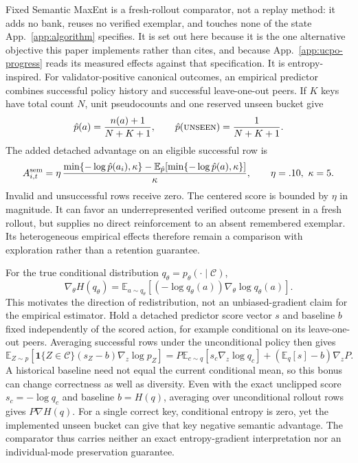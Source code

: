 \documentclass{article}
\newcommand{\1}{\mathbf 1}
\newcommand{\E}{\mathbb E}
\theoremstyle{remark}
\theoremstyle{definition}
\theoremstyle{plain}
\begin{document}
Fixed Semantic MaxEnt is a fresh-rollout comparator, not a replay method: it
adds no bank, reuses no verified exemplar, and touches none of the state
App.~\ref{app:algorithm} specifies. It is set out here because it is the one
alternative objective this paper implements rather than cites, and because
App.~\ref{app:ucpo-progress} reads its measured effects against that
specification. It is entropy-inspired.
For validator-positive canonical outcomes, an empirical predictor combines
successful policy history and successful leave-one-out peers. If $K$ keys
have total count $N$, unit pseudocounts and one reserved unseen bucket give
\begin{equation}
  \hat p(a)=\frac{n(a)+1}{N+K+1},\qquad
  \hat p(\textsc{unseen})=\frac{1}{N+K+1}.
  \label{eq:open-set-predictor}
\end{equation}
The added detached advantage on an eligible successful row is
\begin{equation}
  A^{\rm sem}_{i,t}=\eta\,
  \frac{\min\{-\log\hat p(a_i),\kappa\}
    -\E_{\hat p}[\min\{-\log\hat p(a),\kappa\}]}{\kappa},
  \qquad \eta=.10,\ \kappa=5.
  \label{eq:legacy-semantic-advantage}
\end{equation}
Invalid and unsuccessful rows receive zero. The centered score is bounded
by $\eta$ in magnitude. It can favor an underrepresented verified outcome
present in a fresh rollout, but supplies no direct reinforcement to an
absent remembered exemplar. Its heterogeneous empirical effects therefore
remain a comparison with exploration rather than a retention guarantee.

For the true conditional distribution $q_\theta=p_\theta(\cdot\mid\mathcal C)$,
\begin{equation}
 \nabla_\theta H(q_\theta)
 =\E_{a\sim q_\theta}[(-\log q_\theta(a))\nabla_\theta\log q_\theta(a)].
 \label{eq:entropy-score-function}
\end{equation}
This motivates the direction of redistribution, not an unbiased-gradient
claim for the empirical estimator. Hold a detached predictor score vector
$s$ and baseline $b$ fixed independently of the scored action, for example
conditional on its leave-one-out peers. Averaging successful rows under the
unconditional policy then gives
\[
 \E_{Z\sim p}[\1\{Z\in\mathcal C\}(s_Z-b)\nabla_z\log p_Z]
 =P\E_{c\sim q}[s_c\nabla_z\log q_c]
   +(\E_q[s]-b)\nabla_zP.
\]
A historical baseline need not equal the current conditional mean, so this
bonus can change correctness as well as diversity. Even with the exact
unclipped score $s_c=-\log q_c$ and baseline $b=H(q)$, averaging over
unconditional rollout rows gives $P\nabla H(q)$.
For a single correct key, conditional entropy is zero, yet the implemented
unseen bucket can give that key negative semantic advantage. The comparator
thus carries neither an exact entropy-gradient interpretation nor an
individual-mode preservation guarantee.
\end{document}
